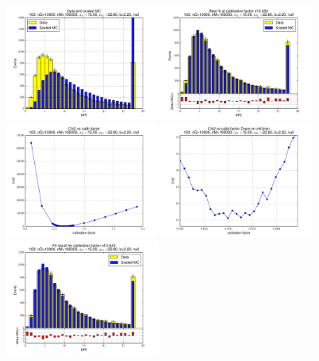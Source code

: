 
 \begin{figure}[htbp] \begin{center} 
\includegraphics[width=0.45\textwidth]{../FIGURES/163/FIG_Data_and_scaled_MC.pdf} 
\includegraphics[width=0.45\textwidth]{../FIGURES/163/FIG_Best_fit_at_calibration_factor_of_0_650.pdf} 
\includegraphics[width=0.45\textwidth]{../FIGURES/163/FIG_Chi2_vs_calib_factor.pdf} 
\includegraphics[width=0.45\textwidth]{../FIGURES/163/FIG_Chi2_vs_calib_factor_Zoom_on_chi2min.pdf} 
\includegraphics[width=0.45\textwidth]{../FIGURES/163/FIG_Fit_result_for_calibration_factor_of_0_643.pdf} 

\end{center}
\end{figure}
